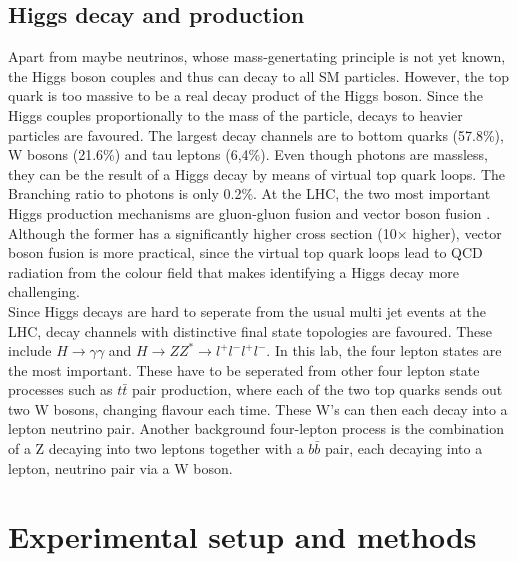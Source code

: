 \documentclass[twoside,        %
               BCOR12mm,       %
               ngerman,english, %
               fleqn,headsepline=false,footsepline=false
              ]{Vorlage/MFPREPORT}
\begin{document}
\subsection{Higgs decay and production}
\label{sec:bg}
Apart from maybe neutrinos, whose mass-genertating principle is not yet known,
the Higgs boson couples and thus can decay to all SM particles. However, the
top quark is too massive to be a real decay product of the Higgs boson. Since
the Higgs couples proportionally to the mass of the particle, decays to heavier
particles are favoured. The largest decay channels are to bottom quarks
(57.8\%), W bosons (21.6\%) and tau leptons (6,4\%). Even though photons are
massless, they can be the result of a Higgs decay by means of virtual top quark
loops. The Branching ratio to photons is only 0.2\%.
At the LHC, the two most important Higgs production mechanisms are gluon-gluon
fusion and vector boson fusion \cite[p.\;490f]{thomson}. Although the former
has a significantly higher cross section (10$\times$ higher), vector boson fusion is more
practical, since the virtual top quark loops lead to QCD radiation from the
colour field that makes identifying a Higgs decay more challenging.\\
Since Higgs decays are hard to seperate from the usual multi jet events at the
LHC, decay channels with distinctive final state topologies are favoured. These
include $H\rightarrow\gamma\gamma$ and $H\rightarrow ZZ^*\rightarrow
l^+l^-l^+l^-$. In this lab, the four lepton states are the most important. 
These have to be seperated from other four lepton state processes such as
$t\bar t$ pair production, where each of the two top quarks sends out two W bosons, changing
flavour each time. These W's can then each decay into a lepton neutrino pair.
Another background four-lepton process is the combination of a Z decaying into
two leptons together with a $b\bar b$ pair, each decaying into a lepton,
neutrino pair via a W boson.




\section{Experimental setup and methods}
\label{sec:setup}
\end{document}
